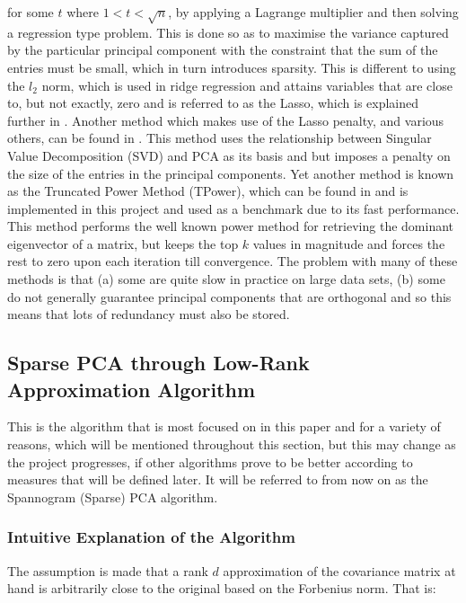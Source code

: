 \documentclass[11pt,a4paper]{article}
\begin{document}
for some $t$ where $1<t<\sqrt{n}$, by applying a Lagrange multiplier and then solving a regression type problem. This is done so as to maximise the variance captured by the particular principal component with the constraint that the sum of the entries must be small, which in turn introduces sparsity. This is different to using the $l_2$ norm, which is used in ridge regression and attains variables that are close to, but not exactly, zero and is referred to as the Lasso, which is explained further in \cite{lasso}. Another method which makes use of the Lasso penalty, and various others, can be found in \cite{shen}. This method uses the relationship between Singular Value Decomposition (SVD) and PCA as its basis and but imposes a penalty on the size of the entries in the principal components. Yet another method is known as the Truncated Power Method (TPower), which can be found in \cite{truncpower} and is implemented in this project and used as a benchmark due to its fast performance. This method performs the well known power method for retrieving the dominant eigenvector of a matrix, but keeps the top $k$ values in magnitude and forces the rest to zero upon each iteration till convergence. The problem with many of these methods is that (a) some are quite slow in practice on large data sets, (b) some do not generally guarantee principal components that are orthogonal and so this means that lots of redundancy must also be stored. 

\subsection{Sparse PCA through Low-Rank Approximation Algorithm}
This is the algorithm\cite{dimakis} that is most focused on in this paper and for a variety of reasons, which will be mentioned throughout this section, but this may change as the project progresses, if other algorithms prove to be better according to measures that will be defined later. It will be referred to from now on as the Spannogram (Sparse) PCA  algorithm.

\subsubsection{Intuitive Explanation of the Algorithm}
The assumption is made that a rank $d$ approximation of the covariance matrix at hand is arbitrarily close to the original based on the Forbenius norm. That is:
\end{document}
